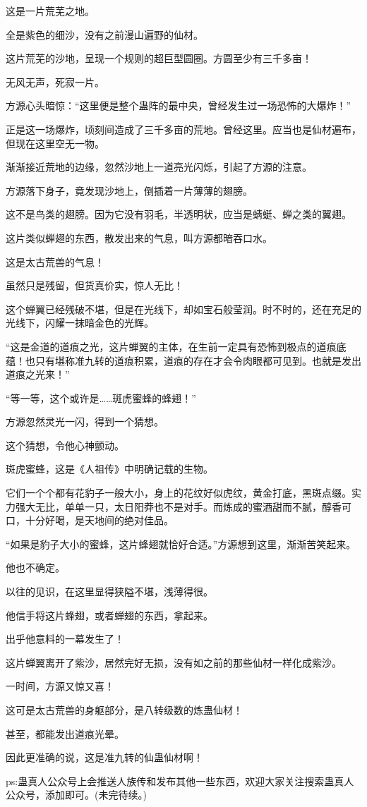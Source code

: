\begin{this_body}
这是一片荒芜之地。

全是紫色的细沙，没有之前漫山遍野的仙材。

这片荒芜的沙地，呈现一个规则的超巨型圆圈。方圆至少有三千多亩！

无风无声，死寂一片。

方源心头暗惊：“这里便是整个蛊阵的最中央，曾经发生过一场恐怖的大爆炸！”

正是这一场爆炸，顷刻间造成了三千多亩的荒地。曾经这里。应当也是仙材遍布，但现在这里空无一物。

渐渐接近荒地的边缘，忽然沙地上一道亮光闪烁，引起了方源的注意。

方源落下身子，竟发现沙地上，倒插着一片薄薄的翅膀。

这不是鸟类的翅膀。因为它没有羽毛，半透明状，应当是蜻蜓、蝉之类的翼翅。

这片类似蝉翅的东西，散发出来的气息，叫方源都暗吞口水。

这是太古荒兽的气息！

虽然只是残留，但货真价实，惊人无比！

这个蝉翼已经残破不堪，但是在光线下，却如宝石般莹润。时不时的，还在充足的光线下，闪耀一抹暗金色的光辉。

“这是金道的道痕之光，这片蝉翼的主体，在生前一定具有恐怖到极点的道痕底蕴！也只有堪称准九转的道痕积累，道痕的存在才会令肉眼都可见到。也就是发出道痕之光来！”

“等一等，这个或许是……斑虎蜜蜂的蜂翅！”

方源忽然灵光一闪，得到一个猜想。

这个猜想，令他心神颤动。

斑虎蜜蜂，这是《人祖传》中明确记载的生物。

它们一个个都有花豹子一般大小，身上的花纹好似虎纹，黄金打底，黑斑点缀。实力强大无比，单单一只，太日阳莽也不是对手。而炼成的蜜酒甜而不腻，醇香可口，十分好喝，是天地间的绝对佳品。

“如果是豹子大小的蜜蜂，这片蜂翅就恰好合适。”方源想到这里，渐渐苦笑起来。

他也不确定。

以往的见识，在这里显得狭隘不堪，浅薄得很。

他信手将这片蜂翅，或者蝉翅的东西，拿起来。

出乎他意料的一幕发生了！

这片蝉翼离开了紫沙，居然完好无损，没有如之前的那些仙材一样化成紫沙。

一时间，方源又惊又喜！

这可是太古荒兽的身躯部分，是八转级数的炼蛊仙材！

甚至，都能发出道痕光晕。

因此更准确的说，这是准九转的仙蛊仙材啊！

ps:蛊真人公众号上会推送人族传和发布其他一些东西，欢迎大家关注搜索蛊真人公众号，添加即可。(未完待续。)

\end{this_body}

